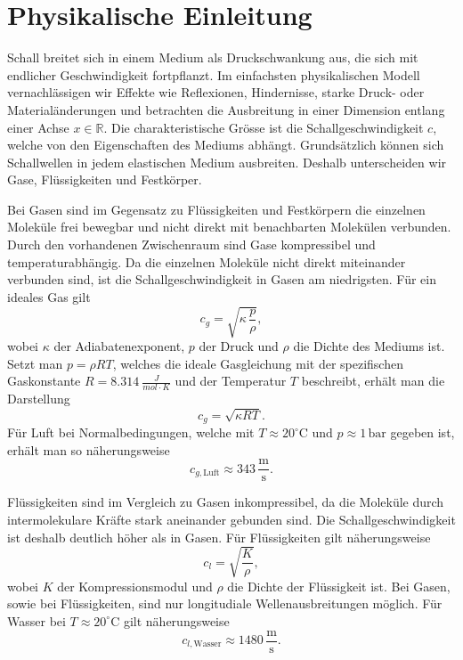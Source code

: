 %
%
%
%
\section{Physikalische Einleitung\label{schall:section:teil0}}

Schall breitet sich in einem Medium als Druckschwankung aus, die sich
mit endlicher Geschwindigkeit fortpflanzt.
Im einfachsten physikalischen Modell vernachlässigen wir Effekte wie
Reflexionen, Hindernisse, starke Druck- oder Materialänderungen und
betrachten die Ausbreitung in einer Dimension entlang einer Achse
$x \in \mathbb{R}$.
Die charakteristische Grösse ist die Schallgeschwindigkeit $c$, welche
von den Eigenschaften des Mediums abhängt.
Grundsätzlich können sich Schallwellen in jedem elastischen Medium ausbreiten.
Deshalb unterscheiden wir Gase, Flüssigkeiten und Festkörper.

Bei Gasen sind im Gegensatz zu Flüssigkeiten und Festkörpern die
einzelnen Moleküle frei bewegbar und nicht direkt mit
benachbarten Molekülen verbunden.
Durch den vorhandenen Zwischenraum sind Gase kompressibel und
temperaturabhängig.
Da die einzelnen Moleküle nicht direkt miteinander verbunden sind,
ist die Schallgeschwindigkeit in Gasen am niedrigsten.
Für ein ideales Gas gilt
\begin{equation}
    c_{g} = \sqrt{\kappa \, \frac{p}{\rho}},
\end{equation}
wobei $\kappa$ der Adiabatenexponent, $p$ der Druck und $\rho$ die
Dichte des Mediums ist.
Setzt man $p = \rho R T$, welches die ideale Gasgleichung mit der
spezifischen Gaskonstante $R = \SI{8.314}{\frac{J}{mol \cdot K}}$
und der Temperatur $T$ beschreibt, erhält man die Darstellung
\begin{equation}
    c_{g} = \sqrt{\kappa R T}.
    \label{eq:c-ideal-gas}
\end{equation}
Für Luft bei Normalbedingungen, welche mit
$T \approx 20^\circ \mathrm{C}$ und $p \approx 1\,\mathrm{bar}$
gegeben ist, erhält man so näherungsweise
\begin{equation}
    c_{g,\text{Luft}} \approx 343 \,\frac{\mathrm{m}}{\mathrm{s}}.
\end{equation}

Flüssigkeiten sind im Vergleich zu Gasen inkompressibel, da die
Moleküle durch intermolekulare Kräfte stark aneinander gebunden sind.
Die Schallgeschwindigkeit ist deshalb deutlich höher als in Gasen.
Für Flüssigkeiten gilt näherungsweise
\begin{equation}
    c_{l} = \sqrt{\frac{K}{\rho}},
    \label{eq:c-liquid}
\end{equation}
wobei $K$ der Kompressionsmodul und $\rho$ die Dichte der Flüssigkeit ist.
Bei Gasen, sowie bei Flüssigkeiten, sind nur longitudiale
Wellenausbreitungen möglich.
Für Wasser bei $T \approx 20^\circ \mathrm{C}$ gilt näherungsweise
\begin{equation}
    c_{l,\text{Wasser}} \approx 1480 \,\frac{\mathrm{m}}{\mathrm{s}}.
\end{equation}


